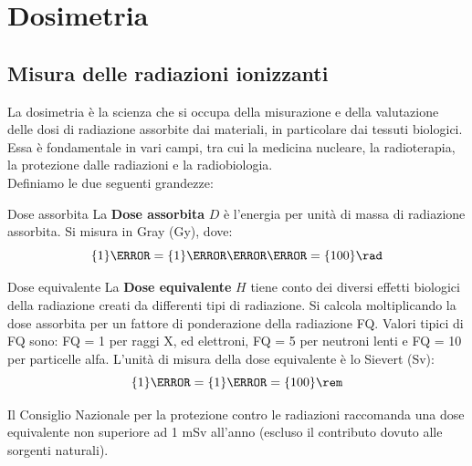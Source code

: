 \chapter{Dosimetria}
\section{Misura delle radiazioni ionizzanti}
La dosimetria è la scienza che si occupa della misurazione e della valutazione delle dosi di radiazione assorbite dai materiali, in particolare dai tessuti biologici. Essa è fondamentale in vari campi, tra cui la medicina nucleare, la radioterapia, la protezione dalle radiazioni e la radiobiologia.\\
Definiamo le due seguenti grandezze:
\begin{definition}{Dose assorbita}
    La \textbf{Dose assorbita} $D$ è l'energia per unità di massa di radiazione assorbita. Si misura in Gray (Gy), dove:
    \begin{equation}
        \qty{1}{\gray} = \qty{1}{\joule\per\kilogram} = \qty{100}{\rad}
    \end{equation}
\end{definition}
\begin{definition}{Dose equivalente}
    La \textbf{Dose equivalente} $H$ tiene conto dei diversi effetti biologici della radiazione creati da differenti tipi di radiazione. Si calcola moltiplicando la dose assorbita per un fattore di ponderazione della radiazione FQ. Valori tipici di FQ sono: FQ = 1 per raggi X, ed elettroni, FQ = 5 per neutroni lenti e FQ = 10 per particelle alfa. L'unità di misura della dose equivalente è lo Sievert (Sv):
    \begin{equation}
        \qty{1}{\sievert} = \qty{1}{\gray} = \qty{100}{\rem}
    \end{equation}
\end{definition}
Il Consiglio Nazionale per la protezione contro le radiazioni raccomanda una dose equivalente non superiore ad 1 mSv all'anno (escluso il contributo dovuto alle sorgenti naturali).
